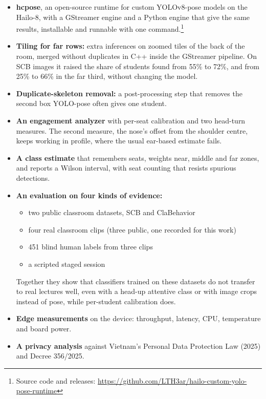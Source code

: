 \begin{itemize}
\tightlist
\item
  \textbf{hcpose}, an open-source runtime for custom YOLOv8-pose models on the Hailo-8, with a GStreamer engine and a Python engine that give the same results, installable and runnable with one command.\footnote{Source code and releases: \url{https://github.com/LTH3ar/hailo-custom-yolo-pose-runtime}}
\item
  \textbf{Tiling for far rows:} extra inferences on zoomed tiles of the back of the room, merged without duplicates in C++ inside the GStreamer pipeline. On SCB images it raised the share of students found from 55\% to 72\%, and from 25\% to 66\% in the far third, without changing the model.
\item
  \textbf{Duplicate-skeleton removal:} a post-processing step that removes the second box YOLO-pose often gives one student.
\item
  \textbf{An engagement analyzer} with per-seat calibration and two head-turn measures. The second measure, the nose's offset from the shoulder centre, keeps working in profile, where the usual ear-based estimate fails.
\item
  \textbf{A class estimate} that remembers seats, weights near, middle and far zones, and reports a Wilson interval, with seat counting that resists spurious detections.
\item
  \textbf{An evaluation on four kinds of evidence:}

  \begin{itemize}
  \tightlist
  \item
    two public classroom datasets, SCB and ClaBehavior
  \item
    four real classroom clips (three public, one recorded for this work)
  \item
    451 blind human labels from three clips
  \item
    a scripted staged session
  \end{itemize}

  Together they show that classifiers trained on these datasets do not transfer to real lectures well, even with a head-up attentive class or with image crops instead of pose, while per-student calibration does.
\item
  \textbf{Edge measurements} on the device: throughput, latency, CPU, temperature and board power.
\item
  \textbf{A privacy analysis} against Vietnam's Personal Data Protection Law (2025) and Decree 356/2025.
\end{itemize}

